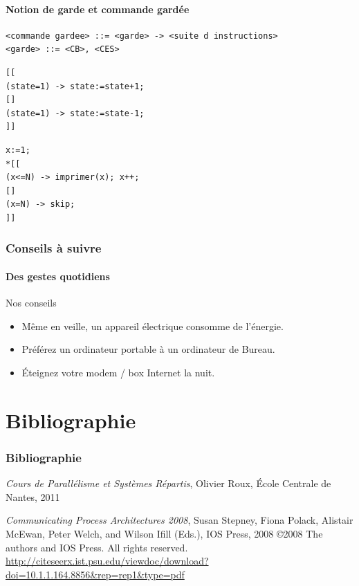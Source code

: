 \documentclass[slidetop,11pt]{beamer}
\begin{document}
\begin{frame} [containsverbatim]
\framesubtitle{Notion de garde et commande gardée}

 \begin{lstlisting}[frame=trBL]
<commande gardee> ::= <garde> -> <suite d instructions>
<garde> ::= <CB>, <CES>
\end{lstlisting}

\begin{lstlisting}[frame=trBL,title={Sélective}]
[[
(state=1) -> state:=state+1;
[]
(state=1) -> state:=state-1;
]]
\end{lstlisting}

\begin{lstlisting}[frame=trBL,title={Répétitive}]
x:=1;
*[[
(x<=N) -> imprimer(x); x++;
[]
(x=N) -> skip;
]]
\end{lstlisting}
\end{frame}


\begin{frame} 
  \frametitle{Conseils à suivre}
  \framesubtitle{Des gestes quotidiens}
  \begin{block}{Nos conseils}
     \begin{itemize}[<+->]
       \item Même en veille, un appareil électrique consomme de l'énergie.
       \item Préférez un ordinateur portable à un ordinateur de Bureau.
       \item Éteignez votre modem / box Internet la nuit.
     \end{itemize}
  \end{block}   
\end{frame}



\section{Bibliographie}

\begin{frame} 
\frametitle{Bibliographie}

\begin{thebibliography}{Cpa2008}
 {\textit{Cours de Parallélisme et Systèmes Répartis}, Olivier Roux, \'Ecole Centrale de Nantes, 2011}

 {\textit{Communicating Process Architectures 2008}, Susan Stepney, Fiona Polack, Alistair McEwan, Peter Welch, and Wilson Ifill (Eds.), IOS Press, 2008
\copyright 2008 The authors and IOS Press. All rights reserved.\\
\url{http://citeseerx.ist.psu.edu/viewdoc/download?doi=10.1.1.164.8856&rep=rep1&type=pdf}}
\end{thebibliography}
\end{frame}
\end{document}
